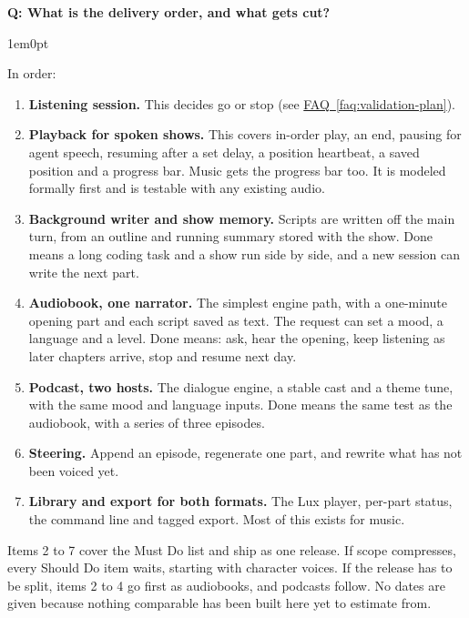 \documentclass[11pt,letterpaper]{article} %
\newcounter{faqnum} %
\newenvironment{faqpair}[1]{%
  \needspace{4\baselineskip}%
  \vspace{0.5em}%
  \refstepcounter{faqnum}%
  \noindent\textbf{\color{SectionBlue}Q\thefaqnum: #1}\par\nopagebreak[4]%
  \vspace{0.2em}%
  \begin{adjustwidth}{1em}{0pt}%
  \setlength{\parindent}{0pt}%
  \setlength{\parskip}{0.5em}%
}{%
  \end{adjustwidth}%
  \vspace{0.5em}%
}
\newcommand{\faqref}[1]{\hyperref[#1]{FAQ~\ref*{#1}}}
\begin{document}
\begin{faqpair}{What is the delivery order, and what gets cut?}\label{faq:timeline}

  In order:

  \begin{enumerate}[leftmargin=1.5em, nosep]
    \item \textbf{Listening session.} This decides go or stop
          (see \faqref{faq:validation-plan}).

    \item \textbf{Playback for spoken shows.} This covers in-order play, an
          end, pausing for agent speech, resuming after a set delay, a
          position heartbeat, a saved position and a progress bar. Music
          gets the progress bar too. It is modeled formally first and is
          testable with any existing audio.

    \item \textbf{Background writer and show memory.} Scripts are written
          off the main turn, from an outline and running summary stored
          with the show. Done means a long coding task and a show run side
          by side, and a new session can write the next part.

    \item \textbf{Audiobook, one narrator.} The simplest engine path, with
          a one-minute opening part and each script saved as text. The
          request can set a mood, a language and a level. Done means: ask,
          hear the opening, keep listening as later chapters arrive, stop
          and resume next day.

    \item \textbf{Podcast, two hosts.} The dialogue engine, a stable cast
          and a theme tune, with the same mood and language inputs. Done
          means the same test as the audiobook, with a series of three
          episodes.

    \item \textbf{Steering.} Append an episode, regenerate one part, and
          rewrite what has not been voiced yet.

    \item \textbf{Library and export for both formats.} The Lux player,
          per-part status, the command line and tagged export. Most of this
          exists for music.
  \end{enumerate}

  Items 2 to 7 cover the Must Do list and ship as one release. If scope
  compresses, every Should Do item waits, starting with character voices.
  If the release has to be split, items 2 to 4 go first as audiobooks, and
  podcasts follow. No dates are given because nothing comparable has been
  built here yet to estimate from.
\end{faqpair}
\end{document}
